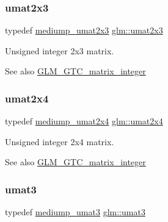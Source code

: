 \subsubsection{\texorpdfstring{umat2x3}{umat2x3}}
{\footnotesize\ttfamily typedef \hyperlink{group__gtc__matrix__integer_ga23dfc19249ad27dc4b02615f1d045ba1}{mediump\+\_\+umat2x3} \hyperlink{group__gtc__matrix__integer_ga890ae28f9230794138b2c89f44ce3376}{glm\+::umat2x3}}

Unsigned integer 2x3 matrix. \begin{DoxySeeAlso}{See also}
\hyperlink{group__gtc__matrix__integer}{G\+L\+M\+\_\+\+G\+T\+C\+\_\+matrix\+\_\+integer} 
\end{DoxySeeAlso}
\mbox{\label{group__gtc__matrix__integer_ga3b23b164240cf4dfb429776da7be9d88}} 
\subsubsection{\texorpdfstring{umat2x4}{umat2x4}}
{\footnotesize\ttfamily typedef \hyperlink{group__gtc__matrix__integer_ga972445669c6e6652716f3f0b664b94cd}{mediump\+\_\+umat2x4} \hyperlink{group__gtc__matrix__integer_ga3b23b164240cf4dfb429776da7be9d88}{glm\+::umat2x4}}

Unsigned integer 2x4 matrix. \begin{DoxySeeAlso}{See also}
\hyperlink{group__gtc__matrix__integer}{G\+L\+M\+\_\+\+G\+T\+C\+\_\+matrix\+\_\+integer} 
\end{DoxySeeAlso}
\mbox{\label{group__gtc__matrix__integer_ga8b8fbc858e28abf8fc344744f8d6d368}} 
\subsubsection{\texorpdfstring{umat3}{umat3}}
{\footnotesize\ttfamily typedef \hyperlink{group__gtc__matrix__integer_ga953d4cb3e70d85567756b3fbcca0e9e9}{mediump\+\_\+umat3} \hyperlink{group__gtc__matrix__integer_ga8b8fbc858e28abf8fc344744f8d6d368}{glm\+::umat3}}

